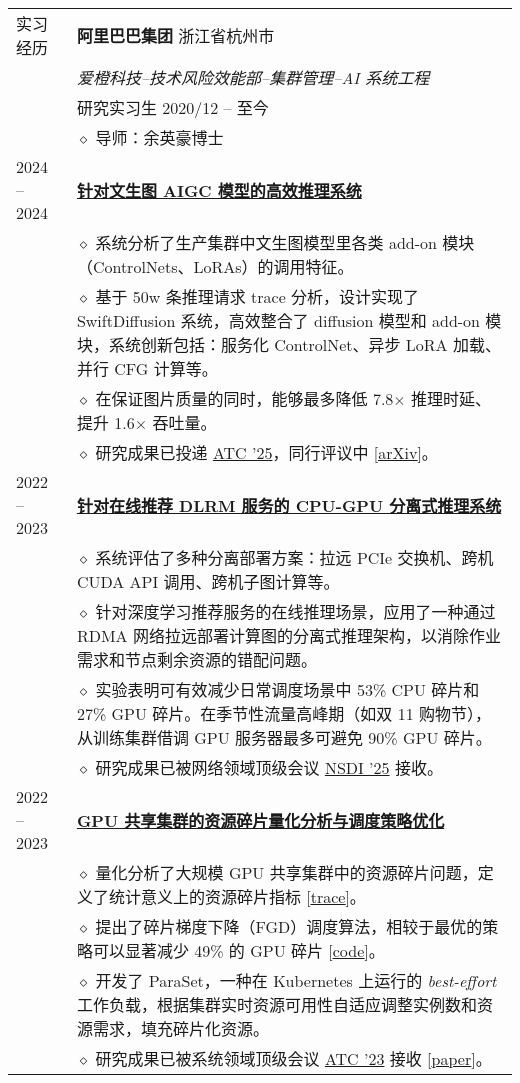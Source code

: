 \documentclass[letterpaper, 10pt]{article}
\begin{document}
\begin{longtable}{p{0.7in}p{6.0in}}
{实习经历}
& {\textbf{阿里巴巴集团}} \hfill 浙江省杭州市 \\
& \textit{爱橙科技--技术风险效能部--集群管理--AI 系统工程} \\
& 研究实习生 \hfill 2020/12 -- 至今 \\
& $\diamond$ 导师：余英豪博士 \\

2024 -- 2024
& \textbf{\underline{针对文生图 AIGC 模型的高效推理系统}} \hfill \\
    & $\diamond$ 系统分析了生产集群中文生图模型里各类 add-on 模块（ControlNets、LoRAs）的调用特征。\\
    & $\diamond$ 基于 50w 条推理请求 trace 分析，设计实现了 SwiftDiffusion 系统，高效整合了 diffusion 模型和 add-on 模块，系统创新包括：服务化 ControlNet、异步 LoRA 加载、并行 CFG 计算等。\\
    & $\diamond$ 在保证图片质量的同时，能够最多降低 7.8$\times$ 推理时延、提升 1.6$\times$ 吞吐量。\\
    & $\diamond$ 研究成果已投递 \underline{ATC '25}，同行评议中 [\href{https://arxiv.org/abs/2407.02031}{\underline{arXiv}}]。\\

2022 -- 2023
& \textbf{\underline{针对在线推荐 DLRM 服务的 CPU-GPU 分离式推理系统}} \hfill \\
    & $\diamond$ 系统评估了多种分离部署方案：拉远 PCIe 交换机、跨机 CUDA API 调用、跨机子图计算等。\\
    & $\diamond$ 针对深度学习推荐服务的在线推理场景，应用了一种通过 RDMA 网络拉远部署计算图的分离式推理架构，以消除作业需求和节点剩余资源的错配问题。\\
    & $\diamond$ 实验表明可有效减少日常调度场景中 53\% CPU 碎片和 27\% GPU 碎片。在季节性流量高峰期（如双 11 购物节），从训练集群借调 GPU 服务器最多可避免 90\% GPU 碎片。\\
    & $\diamond$ 研究成果已被网络领域顶级会议 \underline{NSDI '25} 接收。\\

2022 -- 2023
& \textbf{\underline{GPU 共享集群的资源碎片量化分析与调度策略优化}} \\
    & $\diamond$ 量化分析了大规模 GPU 共享集群中的资源碎片问题，定义了统计意义上的资源碎片指标 [\href{https://github.com/alibaba/clusterdata/tree/master/cluster-trace-gpu-v2023}{\underline{trace}}]。\\
    & $\diamond$ 提出了碎片梯度下降（FGD）调度算法，相较于最优的策略可以显著减少 49\% 的 GPU 碎片 [\href{https://github.com/hkust-adsl/kubernetes-scheduler-simulator}{\underline{code}}]。\\
    & $\diamond$ 开发了 ParaSet，一种在 Kubernetes 上运行的 \textit{best-effort} 工作负载，根据集群实时资源可用性自适应调整实例数和资源需求，填充碎片化资源。\\
    & $\diamond$ 研究成果已被系统领域顶级会议 \underline{ATC '23} 接收 [\href{https://www.usenix.org/conference/atc23/presentation/weng}{\underline{paper}}]。\\


\end{longtable}
\end{document}
